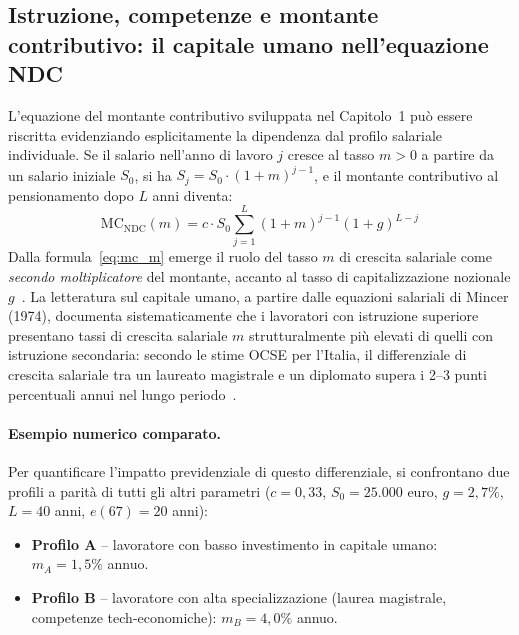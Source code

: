 \subsection{Istruzione, competenze e montante contributivo:
            il capitale umano nell'equazione NDC}
\label{subsec:istruzione_ndc}

L'equazione del montante contributivo sviluppata nel Capitolo~1 può essere
riscritta evidenziando esplicitamente la dipendenza dal profilo salariale
individuale. Se il salario nell'anno di lavoro \(j\) cresce al tasso
\(m > 0\) a partire da un salario iniziale \(S_0\), si ha
\(S_j = S_0 \cdot (1+m)^{j-1}\), e il montante contributivo al
pensionamento dopo \(L\) anni diventa:
%
\begin{equation}
  \mathrm{MC}_{\mathrm{NDC}}(m)
  = c \cdot S_0
    \sum_{j=1}^{L} (1+m)^{j-1}(1+g)^{L-j}
  \label{eq:mc_m}
\end{equation}
%
Dalla formula~\eqref{eq:mc_m} emerge il ruolo del tasso \(m\) di crescita
salariale come \emph{secondo moltiplicatore} del montante, accanto al
tasso di capitalizzazione nozionale \(g\)~\cite{Bosi2018}. La letteratura
sul capitale umano, a partire dalle equazioni salariali di Mincer (1974),
documenta sistematicamente che i lavoratori con istruzione superiore
presentano tassi di crescita salariale \(m\) strutturalmente più elevati di
quelli con istruzione secondaria: secondo le stime OCSE per l'Italia,
il differenziale di crescita salariale tra un laureato magistrale e un
diplomato supera i 2--3 punti percentuali annui nel lungo periodo~\cite{Mincer1974, OECD2023}.

\paragraph{Esempio numerico comparato.}
Per quantificare l'impatto previdenziale di questo differenziale, si
confrontano due profili a parità di tutti gli altri parametri
(\(c = 0{,}33\), \(S_0 = 25.000\) euro, \(g = 2{,}7\%\), \(L = 40\) anni,
\(e(67) = 20\) anni):

\begin{itemize}
  \item \textbf{Profilo A} -- lavoratore con basso investimento in capitale
    umano: \(m_A = 1{,}5\%\) annuo.
  \item \textbf{Profilo B} -- lavoratore con alta specializzazione
    (laurea magistrale, competenze tech-economiche): \(m_B = 4{,}0\%\) annuo.
\end{itemize}

